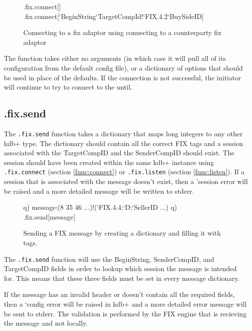 \begin{figure}[H]
\begin{qcode}
.fix.connect[]
.fix.connect[`BeginString`TargetCompId!`FIX.4.2`BuySideID]
\end{qcode}
\caption{Connecting to a fix adaptor using connecting to a counterparty fix adaptor}
\end{figure}

The function takes either no arguments (in which case it will pull all of its configuration from the default config file), or a dictionary of options that
should be used in place of the defaults. If the connection is not successful, the
initiator will continue to try to connect to the until.

\subsection{.fix.send}
\label{func:send}

The \texttt{.fix.send} function takes a dictionary that maps long integers to any other kdb+ type. The dictionary should contain all the correct FIX tags and a session associated with the TargetCompID and the SenderCompID should exist. The session should have been created within the same kdb+ instance using \texttt{.fix.connect} (section \ref{func:connect}) or \texttt{.fix.listen} (section \ref{func:listen}). If a session that is associated with the message doesn't exist, then a 'session error will be raised and a more detailed message will be written to stderr.

\begin{figure}[H]
\begin{qcode}
q) message:(8 35 46 ...)!(`FIX.4.4;`D;`SellerID ...)
q) .fix.send[message]
\end{qcode}
\caption{Sending a FIX message by creating a dictionary and filling it with tags.}
\end{figure}

The \texttt{.fix.send} function will use the BeginString, SenderCompID, and TargetCompID fields in order to lookup which session the message is intended for.
This means that these three fields must be set in every message dictionary. 

If the message has an invalid header or doesn't contain all the required fields, then a `config error will be raised in kdb+ and a more detailed error message will be sent to stderr. The validation is performed by the FIX engine that is recieving the message
and not locally.

